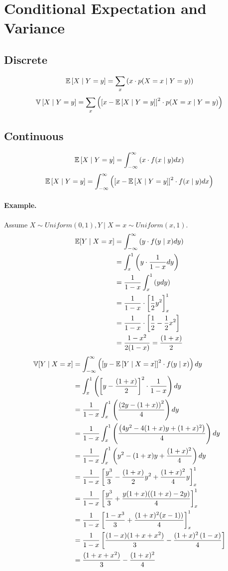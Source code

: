 \section{Conditional Expectation and Variance}

\subsection{Discrete}
\[\operatorname{\mathbb{E}}\left[X\mid Y=y\right] = \sum_x \left(x \cdot p(X=x \mid Y=y)\right)\]
\[\operatorname{\mathbb{V}}\left[X\mid Y=y\right] = \sum_x \left(\left[x-\operatorname{\mathbb{E}}\left[X\mid Y=y\right]\right]^2 \cdot p(X=x \mid Y=y)\right)\]

\subsection{Continuous}
\[\operatorname{\mathbb{E}}\left[X\mid Y=y\right] = \int_{-\infty}^\infty \left(x \cdot f(x\mid y) dx\right)\]
\[\operatorname{\mathbb{E}}\left[X\mid Y=y\right] = \int_{-\infty}^\infty \left(\left[x-\operatorname{\mathbb{E}}\left[X\mid Y=y\right]\right]^2 \cdot f(x\mid y) dx\right)\]

\paragraph{Example.}
Assume $X\sim Uniform(0,1), Y\mid X=x \sim Uniform(x,1)$. 
\begin{align*}
\operatorname{\mathbb{E}}[Y\mid X=x] &= \int_{-\infty}^\infty \left(y \cdot f(y\mid x) dy\right) \\
&= \int_x^1 \left(y \cdot \frac{1}{1-x} dy\right)\\
&= \frac{1}{1-x} \int_x^1 \left(y dy\right)\\
&= \frac{1}{1-x} \cdot \left[\frac{1}{2}y^2\right]^1_x\\
&= \frac{1}{1-x} \cdot \left[\frac{1}{2}-\frac{1}{2}x^2\right]\\
&= \frac{1-x^2}{2(1-x)} = \frac{(1+x)}{2}
\end{align*}
\begin{align*}
\operatorname{\mathbb{V}}[Y\mid X=x] &= \int_{-\infty}^\infty  \left(\left[y-\operatorname{\mathbb{E}}\left[Y\mid X=x\right]\right]^2 \cdot f(y\mid x) \right)dy \\
& =  \int_x^1  \left(\left[y - \frac{(1+x)}{2}\right]^2 \cdot  \frac{1}{1-x} \right)dy\\
& =  \frac{1}{1-x} \int_x^1  \left(\frac{\left(2y - (1 +x)\right)^2}{4} \right)dy\\
& = \frac{1}{1-x} \int_x^1  \left(\frac{\left(4y^2 - 4(1 +x)y + (1 +x)^2\right)}{4} \right)dy\\
& = \frac{1}{1-x} \int_x^1  \left(y^2 - (1+x)y +\frac{(1 +x)^2}{4} \right)dy\\
& = \frac{1}{1-x} \left[\frac{y^3}{3} - \frac{(1+x)}{2}y^2 +\frac{(1 +x)^2}{4}y \right]^1_x\\
& = \frac{1}{1-x} \left[\frac{y^3}{3} + \frac{y(1+x)((1+x)-2y)}{4} \right]^1_x\\
& = \frac{1}{1-x} \left[\frac{1-x^3}{3} + \frac{(1+x)^2(x-1))}{4} \right]^1_x\\
& = \frac{1}{1-x} \left[ \frac{(1-x)(1+x+x^2)}{3} - \frac{(1+x)^2\left(1-x\right)}{4} \right]\\
& = \frac{(1+x+x^2)}{3} -\frac{(1+x)^2}{4}
\end{align*}

